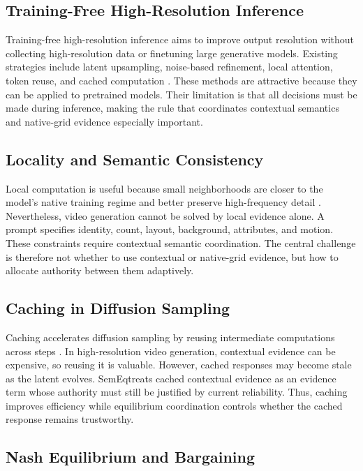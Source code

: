 \documentclass[10pt,twocolumn]{article}
\newcommand{\method}{SemEq}
\begin{document}
\subsection{Training-Free High-Resolution Inference}

Training-free high-resolution inference aims to improve output resolution without collecting high-resolution data or finetuning large generative models. Existing strategies include latent upsampling, noise-based refinement, local attention, token reuse, and cached computation \cite{meng2021sdedit,bolya2023tome,ma2024deepcache}. These methods are attractive because they can be applied to pretrained models. Their limitation is that all decisions must be made during inference, making the rule that coordinates contextual semantics and native-grid evidence especially important.

\subsection{Locality and Semantic Consistency}

Local computation is useful because small neighborhoods are closer to the model's native training regime and better preserve high-frequency detail \cite{liu2021swin,hassani2023nat}. Nevertheless, video generation cannot be solved by local evidence alone. A prompt specifies identity, count, layout, background, attributes, and motion. These constraints require contextual semantic coordination. The central challenge is therefore not whether to use contextual or native-grid evidence, but how to allocate authority between them adaptively.

\subsection{Caching in Diffusion Sampling}

Caching accelerates diffusion sampling by reusing intermediate computations across steps \cite{ma2024deepcache}. In high-resolution video generation, contextual evidence can be expensive, so reusing it is valuable. However, cached responses may become stale as the latent evolves. \method treats cached contextual evidence as an evidence term whose authority must still be justified by current reliability. Thus, caching improves efficiency while equilibrium coordination controls whether the cached response remains trustworthy.

\subsection{Nash Equilibrium and Bargaining}
\end{document}
